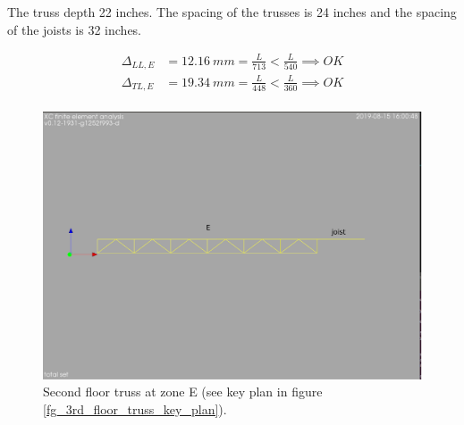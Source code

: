 \noindent The truss depth 22 inches. The spacing of the trusses is 24 inches and the spacing of the joists is 32 inches.

\begin{align}
\Delta_{LL,E} &= 12.16\ mm= \frac{L}{713} < \frac{L}{540} \implies OK \\
\Delta_{TL,E} &= 19.34\ mm= \frac{L}{448} < \frac{L}{360} \implies OK \\
\end{align}


\begin{figure}
  \begin{center}
  \includegraphics[width=120mm]{figures/trusses/2nd_floor_truss_E}
  \end{center}
  \caption{Second floor truss at zone E (see key plan in figure \ref{fg_3rd_floor_truss_key_plan}).}\label{fg_2nd_floor_truss_E}
\end{figure}
